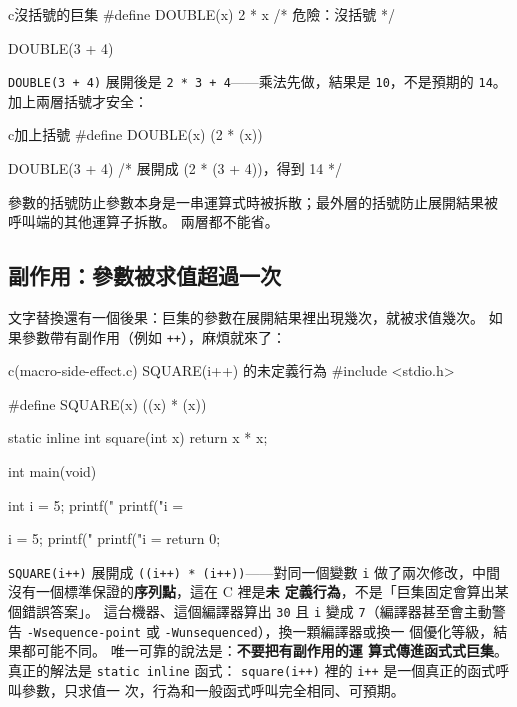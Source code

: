 \begin{code}{c}{沒括號的巨集}
#define DOUBLE(x) 2 * x   /* 危險：沒括號 */

DOUBLE(3 + 4)
\end{code}

\texttt{DOUBLE(3 + 4)} 展開後是 \texttt{2 * 3 + 4}——乘法先做，結果是
\texttt{10}，不是預期的 \texttt{14}。 加上兩層括號才安全：

\begin{code}{c}{加上括號}
#define DOUBLE(x) (2 * (x))

DOUBLE(3 + 4)   /* 展開成 (2 * (3 + 4))，得到 14 */
\end{code}

參數的括號防止參數本身是一串運算式時被拆散；最外層的括號防止展開結果被
呼叫端的其他運算子拆散。 兩層都不能省。

\subsection{副作用：參數被求值超過一次}

文字替換還有一個後果：巨集的參數在展開結果裡出現幾次，就被求值幾次。
如果參數帶有副作用（例如 \texttt{++}），麻煩就來了：

\begin{example}{c}{(macro-side-effect.c) SQUARE(i++) 的未定義行為}
#include <stdio.h>

#define SQUARE(x) ((x) * (x))

static inline int square(int x) {
    return x * x;
}

int main(void) {
    int i = 5;
    printf("%
    printf("i = %

    i = 5;
    printf("%
    printf("i = %
    return 0;
}
\end{example}


\texttt{SQUARE(i++)} 展開成 \texttt{((i++) * (i++))}——對同一個變數 \texttt{i}
做了兩次修改，中間沒有一個標準保證的\textbf{序列點}，這在 C 裡是\textbf{未
定義行為}，不是「巨集固定會算出某個錯誤答案」。 這台機器、這個編譯器算出
\texttt{30} 且 \texttt{i} 變成 \texttt{7}（編譯器甚至會主動警告
\texttt{-Wsequence-point} 或 \texttt{-Wunsequenced}），換一顆編譯器或換一
個優化等級，結果都可能不同。 唯一可靠的說法是：\textbf{不要把有副作用的運
算式傳進函式式巨集}。 真正的解法是 \texttt{static inline} 函式：
\texttt{square(i++)} 裡的 \texttt{i++} 是一個真正的函式呼叫參數，只求值一
次，行為和一般函式呼叫完全相同、可預期。

